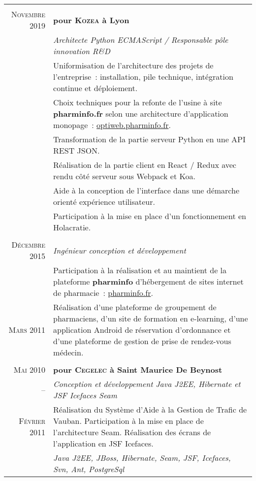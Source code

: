 \documentclass[a4paper,10pt]{article}
\begin{document}
  \begin{supertabular}{r|p{11cm}}
     \\
    \textsc{Novembre} 2019  & \textbf{pour \textsc{Kozea} à Lyon} \\
    & \emph{Architecte Python ECMAScript / Responsable pôle innovation R\&D} \\
    & \footnotesize{
      Uniformisation de l’architecture des projets de l’entreprise :
      installation, pile technique, intégration continue et déploiement.
    } \\
    & \footnotesize{
      Choix techniques pour la refonte de l’usine à site \textbf{pharminfo.fr}
      selon une architecture d’application monopage :
      \href{https://optiweb.pharminfo.fr}{optiweb.pharminfo.fr}.
    } \\
    & \footnotesize{
      Transformation de la partie serveur Python en une API REST JSON.
    } \\
    & \footnotesize{
      Réalisation de la partie client en React / Redux avec rendu côté serveur
      sous Webpack et Koa.
    } \\
    & \footnotesize{
      Aide à la conception de l’interface dans une démarche orienté expérience
      utilisateur.
    } \\
    & \footnotesize{
      Participation à la mise en place d’un fonctionnement en Holacratie.
    } \\
    \\
    \textsc{Décembre} 2015 & \emph{Ingénieur conception et développement} \\
    & \footnotesize{
      Participation à la réalisation et au maintient de la plateforme
      \textbf{pharminfo} d’hébergement de sites internet de pharmacie :
      \href{https://www.pharminfo.fr}{pharminfo.fr}.
    } \\
     \footnotesize{\textsc{Mars} 2011} & \begin{minipage}[b]{0.85\textwidth}\footnotesize{
      Réalisation d'une plateforme de groupement de pharmaciens,
      d’un site de formation en e-learning,
      d'une application Android de réservation d’ordonnance et
      d'une plateforme de gestion de prise de rendez-vous médecin.
    }\end{minipage}
     \\

     \\

    \textsc{Mai} 2010  & \textbf{pour \textsc{Cegelec} à Saint Maurice De Beynost} \\
    -- & \emph{Conception et développement Java J2EE, Hibernate et JSF Icefaces Seam} \\
    \footnotesize{\textsc{Février} 2011} & \footnotesize{Réalisation du Système d’Aide à la Gestion de Trafic de Vauban. Participation à la mise en place de l’architecture Seam. Réalisation des écrans de l’application en JSF Icefaces.} \\
    & \emph{Java J2EE, JBoss, Hibernate, Seam, JSF, Icefaces, Svn, Ant, PostgreSql} \\



\end{supertabular}
\end{document}
